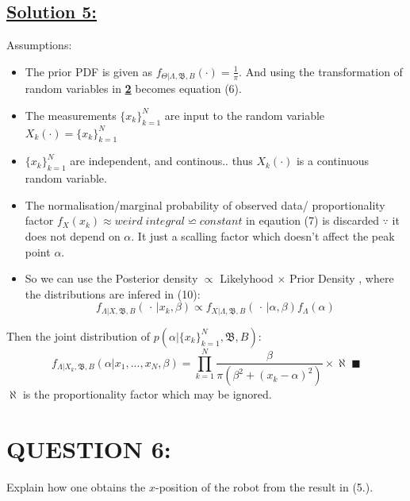 \documentclass[a4paper,11pt]{article}
\begin{document}
\subsection*{\underline{Solution 5:}}
Assumptions:
\begin{itemize}
	\item The prior PDF is given as $f_{\Theta|\Lambda, \mathfrak{B},B}(\cdot) = \frac{1}{\pi}$. And using the transformation of random variables in \hyperref[sec:proof]{\textbf{2}}  becomes equation (6).
	\item The measurements $\{x_k\}^N _{k = 1}$ are input to the random variable $X_k(\cdot) = \{x_k\}^N _{k = 1}$
	\item $\{x_k\}^N _{k = 1}$ are independent, and continous.. thus $X_k(\cdot)$ is a continuous random variable.
	\item The normalisation/marginal probability of observed data/ proportionality factor $f_X(x_k) \approx weird \; integral \backsimeq constant$ in eqaution (7) is discarded $\because$ it does not depend on $\alpha$. It just a scalling factor which doesn't affect the peak point $\alpha$. 
	\item So we can use the Posterior density $\varpropto$ Likelyhood $\times$ Prior Density \cite{stanford_lecture20}, where the distributions are infered in (10):
		\begin{equation}
			f_{\Lambda | X, \mathfrak{B},B} (\, \cdot \, | x_k, \beta) \varpropto f_{X | \Lambda, \mathfrak{B}, B}(\, \cdot \, | \alpha, \beta) f_\Lambda(\alpha)
		\end{equation}
\end{itemize}
Then the joint distribution of $p(\alpha | \{x_k\}^N _{k = 1}, \mathfrak{B}, B)$:
\begin{equation}
	f_{\Lambda | X_k, \mathfrak{B},B} (\alpha | x_1,...,x_N, \beta) = \prod^N _{k = 1} \frac{\beta}{\pi (\beta^2 + (x_k - \alpha)^2)} \times \aleph \; \blacksquare
\end{equation}
$\aleph$ is the proportionality factor which may be ignored.

\section{QUESTION 6:}
Explain how one obtains the $x$-position of the robot from the result in (5.).
\end{document}
